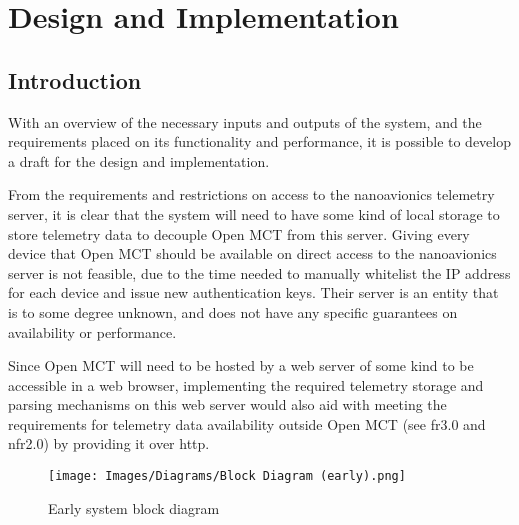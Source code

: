 \begin{comment}
Existing OpenMCT implementations

Design suggestion: Backend server in Node, which gets, parses and stores telemetry, and allows Open MCT and other users to request data in a simple and easily readable format
 - Abstracts away unknowns in connection to NA - rate limits, uptime, accessibility
 - Allows “offline” usage, load telemetry from file or other sources
 - Generate required OMCT data, servers and parsers from definition - trying to minimize code overhead for adding new data
 - Open MCT is the hard part; aim with code should be to minimize work required to get new inputs accessible in Open MCT, since it's the largest unknown
\end{comment}

\section{Design and Implementation}
\subsection{Introduction}
With an overview of the necessary inputs and outputs of the system, and the requirements placed on its functionality and performance, it is possible to develop a draft for the design and implementation.

From the requirements and restrictions on access to the \Gls{nanoavionics} telemetry server, it is clear that the system will need to have some kind of local storage to store telemetry data to decouple Open MCT from this server. Giving every device that Open MCT should be available on direct access to the \Gls{nanoavionics} server is not feasible, due to the time needed to manually whitelist the IP address for each device and issue new authentication keys. Their server is an entity that is to some degree unknown, and does not have any specific guarantees on availability or performance. 

Since Open MCT will need to be hosted by a web server of some kind to be accessible in a web browser, implementing the required telemetry storage and parsing mechanisms on this web server would also aid with meeting the requirements for telemetry data availability outside Open MCT (see \acrshort{fr}3.0 and \acrshort{nfr}2.0) by providing it over \acrshort{http}.

\begin{figure}[H]
  \centering
  \texttt{[image: Images/Diagrams/Block Diagram (early).png]}
  \caption{Early system block diagram}
  \label{fig:block}
\end{figure}

